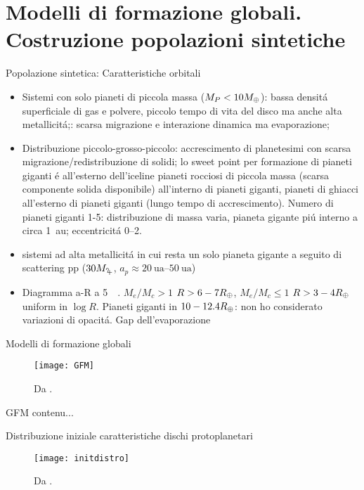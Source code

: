 \section{Modelli di formazione globali. Costruzione popolazioni sintetiche}

\begin{wordonframe}{Popolazione sintetica: Caratteristiche orbitali}
\begin{itemize}
\item Sistemi con solo pianeti di piccola massa ($M_P<10M_{\oplus}{}$): bassa densit\'a superficiale di gas e polvere, piccolo tempo di vita del disco ma anche alta metallicit\'a;: scarsa migrazione e interazione dinamica ma evaporazione;
\item Distribuzione piccolo-grosso-piccolo: accrescimento di planetesimi con scarsa migrazione/redistribuzione di solidi; lo sweet point per formazione di pianeti giganti \'e all'esterno dell'iceline
pianeti rocciosi di piccola massa (scarsa componente solida disponibile) all'interno di pianeti giganti, pianeti di ghiacci all'esterno di pianeti giganti (lungo tempo di accrescimento).
Numero di pianeti giganti 1-5: distribuzione di massa varia, pianeta gigante pi\'u interno a circa \SI{1}{\astronomicalunit}; eccentricit\'a \numrange{0}{2}.
\item sistemi ad alta metallicit\'a in cui resta un solo pianeta gigante a seguito di scattering pp ($30\mjupiter{}$, $a_p\approx\SIrange{20}{50}{\astronomicalunit}$)
\item Diagramma a-R a \SI{5}{\giga\year}. $M_e/M_c>1$ $R>6-7R_{\oplus}{}$, $M_e/M_c\leq1$ $R>3-4R_{\oplus}{}$ uniform in $\log{R}$.
Pianeti giganti in $10-12.4R_{\oplus}{}$: non ho considerato variazioni di opacit\'a. Gap dell'evaporazione
\end{itemize}
\end{wordonframe}

\begin{frame}{Modelli di formazione globali}
\begin{figure}[!ht]
	\texttt{[image: GFM]}
	\caption{Da \cite{benz2014planet}.}\label{fig:GFM}
\end{figure}
\end{frame}

\begin{wordonframe}{GFM}
contenu...
\end{wordonframe}

\begin{frame}{Distribuzione iniziale caratteristiche dischi protoplanetari}
	\begin{figure}[!ht]
		\texttt{[image: initdistro]}
		\caption{Da \cite{mordasini2018planetary}.}\label{fig:initdistro}
	\end{figure}
\end{frame}

